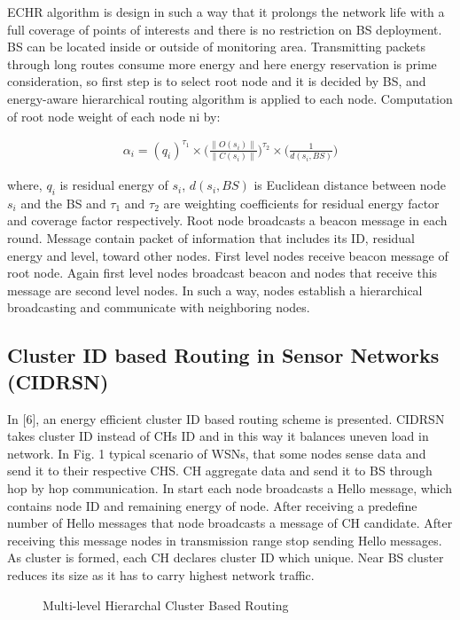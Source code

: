 \documentclass[10pt, conference, compsocconf]{IEEEtran}
\begin{document}
ECHR algorithm is design in such a way that it prolongs the network life with a full coverage of points of interests and there is no restriction on BS deployment. BS can be located inside or outside of monitoring area. Transmitting packets through long routes consume more energy and here energy reservation is prime consideration, so first step is to select root node and it is decided by BS, and energy-aware hierarchical routing algorithm is applied to each node. Computation of root node weight of each node ni by:

\begin{eqnarray}
  \alpha_{i}=(q_{i}) ^{\tau_{1}}\times \Bigg( \frac{\|O(s_{i})\|}{\|C(s_{i})\|}\Bigg) ^{\tau_{2}}\times  \Bigg( \frac {1}{d(s_{i},BS)} \Bigg)
\end{eqnarray}

where, $q_{i}$ is residual energy of $s_{i}$, $d(s_{i}, BS)$ is Euclidean distance  between node $s_{i}$ and the BS and $\tau_{1}$ and $\tau_{2}$ are weighting coefficients for residual energy factor and coverage factor respectively.
Root node broadcasts a beacon message in each round. Message contain packet of information that includes its ID, residual energy and level, toward other nodes. First level nodes receive beacon message of root node. Again first level nodes broadcast beacon and nodes that receive this message are second level nodes. In such a way, nodes establish a hierarchical broadcasting and communicate with neighboring nodes.

\subsection{ Cluster ID based Routing in Sensor Networks (CIDRSN)}
In [6], an energy efficient cluster ID based routing scheme is presented. CIDRSN takes cluster ID instead of CHs ID and in this way it balances uneven load in network. In Fig. 1 typical scenario of WSNs, that some nodes sense data and send it to their respective CHS. CH aggregate data and send it to BS through hop by hop communication. In start each node broadcasts a Hello message, which contains node ID and remaining energy of  node. After receiving a predefine number of Hello messages that node broadcasts a message of CH candidate. After receiving this message nodes in  transmission range stop sending Hello messages. As cluster is formed, each CH declares cluster ID which unique. Near BS cluster reduces its size as it has to carry highest network traffic.

\begin{figure*}[!ht]
  \centering
  \caption{Multi-level Hierarchal Cluster Based Routing}\label{Fig. 1}
\end{figure*}
\end{document}
